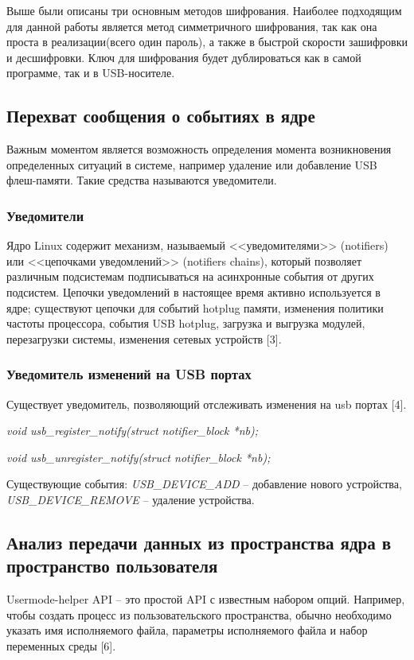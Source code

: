 \documentclass[a4paper, 10pt]{article}
\begin{document}
	Выше были описаны три основным методов шифрования. Наиболее подходящим для данной работы является метод симметричного шифрования, так как она проста в реализации(всего один пароль), а также в быстрой скорости зашифровки и десшифровки. Ключ для шифрования будет дублироваться как в самой программе, так и в USB-носителе.
	\subsection{Перехват сообщения о событиях в ядре}
	\hspace*{5mm} Важным моментом является возможность определения момента возникновения определенных ситуаций в системе, например удаление или добавление USB флеш-памяти. Такие средства называются уведомители.
	\subsubsection{Уведомители}
	\hspace*{5mm} Ядро Linux содержит механизм, называемый <<уведомителями>> (notifiers) или <<цепочками уведомлений>> (notifiers chains), который позволяет различным подсистемам подписываться на асинхронные события от других подсистем. Цепочки уведомлений в настоящее время активно используется в ядре; существуют цепочки для событий hotplug памяти, изменения политики частоты процессора, события USB hotplug, загрузка и выгрузка модулей, перезагрузки системы, изменения сетевых устройств [3].
	
	\subsubsection{Уведомитель изменений на USB портах}
	Существует уведомитель, позволяющий отслеживать изменения на usb портах [4].
	
	\textit{void usb\_register\_notify(struct notifier\_block *nb);}
	
	\textit{void usb\_unregister\_notify(struct notifier\_block *nb);}
	
	\hspace*{-5mm}Существующие события: \textit{USB\_DEVICE\_ADD} -- добавление нового устройства, \textit{USB\_DEVICE\_REMOVE} -- удаление устройства.
	\subsection{Анализ передачи данных из пространства ядра в пространство пользователя}
	\hspace*{5mm}Usermode-helper API -- это простой API с известным набором опций. Например, чтобы создать процесс из пользовательского пространства, обычно необходимо указать имя исполняемого файла, параметры исполняемого файла и набор переменных среды [6].
	
\end{document}
